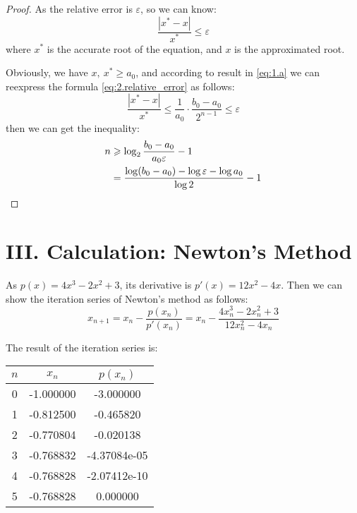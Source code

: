 \documentclass[a4paper]{article}
\begin{document}
\begin{proof}
As the relative error is $\varepsilon$, so we can know:
\begin{equation}
    \frac{|x^{*} - x|}{x^{*}} \leqslant \varepsilon
    \label{eq:2.relative_error}
\end{equation}
where $x^{*}$ is the accurate root of the equation, and $x$ is the approximated root.

Obviously, we have $x,\ x^{*} \geqslant a_0$, and according to result in \ref{eq:1.a} we can reexpress the formula \ref{eq:2.relative_error} as follows:
\begin{equation}
    \frac{|x^{*} - x|}{x^{*}} \leqslant \frac{1}{a_0} \cdot \frac{b_0 - a_0}{2^{n - 1}} \leqslant \varepsilon
    \label{eq:2.proof}
\end{equation}
then we can get the inequality:
\begin{align}
    n & \geqslant \log_2 \frac{b_0 - a_0}{a_0 \varepsilon} - 1 \notag \\
    & = \frac{\log(b_0 - a_0) - \log \varepsilon - \log a_0}{\log 2} - 1
    \label{eq:2.result}
\end{align}

\end{proof}

\section*{III. Calculation: Newton's Method}

As $p(x) = 4x^3 - 2x^2 + 3$, its derivative is $p'(x) = 12x^2 - 4x$. Then we can show the iteration series of Newton's method as follows:
\begin{equation}
    x_{n + 1} = x_n - \frac{p(x_n)}{p'(x_n)} = x_n - \frac{4x_n^3 - 2x_n^2 + 3}{12x_n^2 - 4x_n}
    \label{eq:3.iteration}
\end{equation}

The result of the iteration series is:

\begin{table}[htbp]
    \begin{center}
        \begin{tabular}{|c|c|c|}
            \hline
            $n$ & $x_n$ & $p(x_n)$ \\ \hline
            0 & -1.000000 & -3.000000 \\ \hline
            1 & -0.812500 & -0.465820 \\ \hline
            2 & -0.770804 & -0.020138 \\ \hline
            3 & -0.768832 & -4.37084e-05 \\ \hline
            4 & -0.768828 & -2.07412e-10 \\ \hline
            5 & -0.768828 & 0.000000 \\ \hline
        \end{tabular}
    \end{center}
\end{table}
\end{document}
